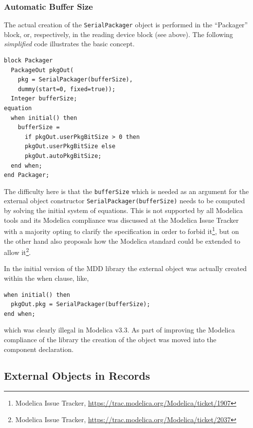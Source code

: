 \documentclass{resources/modelica}
\newcommand{\modelica}[1]{\lstinline[language=modelica]|#1|}
\begin{document}
\subsubsection{Automatic Buffer Size}

The actual creation of the \modelica{SerialPackager} object is performed in
the ``Packager'' block, or, respectively, in the reading device block (see
above). The following \emph{simplified} code illustrates the basic concept.
\begin{lstlisting}[language=modelica]
block Packager
  PackageOut pkgOut(
    pkg = SerialPackager(bufferSize),
    dummy(start=0, fixed=true));
  Integer bufferSize;
equation
  when initial() then
    bufferSize =
      if pkgOut.userPkgBitSize > 0 then
      pkgOut.userPkgBitSize else
      pkgOut.autoPkgBitSize;
  end when;
end Packager;
\end{lstlisting}
The difficulty here is that the \modelica{bufferSize} which is needed as an
argument for the external object constructor
\modelica{SerialPackager(bufferSize)} needs to be computed by solving the
initial system of equations. This is not supported by all Modelica tools and its
Modelica compliance was discussed at the Modelica Issue Tracker with a majority
opting to clarify the specification in order to forbid it\footnote{Modelica Issue Tracker,
\url{https://trac.modelica.org/Modelica/ticket/1907}}, but on the other hand
also proposals how the Modelica standard could be extended to allow
it\footnote{Modelica Issue Tracker,
\url{https://trac.modelica.org/Modelica/ticket/2037}}.

In the initial version of the MDD library the external object was actually
created within the when clause, like,
\begin{lstlisting}[language=modelica]
when initial() then
  pkgOut.pkg = SerialPackager(bufferSize);
end when;
\end{lstlisting}
which was clearly illegal in Modelica v3.3. As part of improving the Modelica
compliance of the library the creation of the object was moved into the
component declaration.

\subsection{External Objects in Records}
\end{document}
